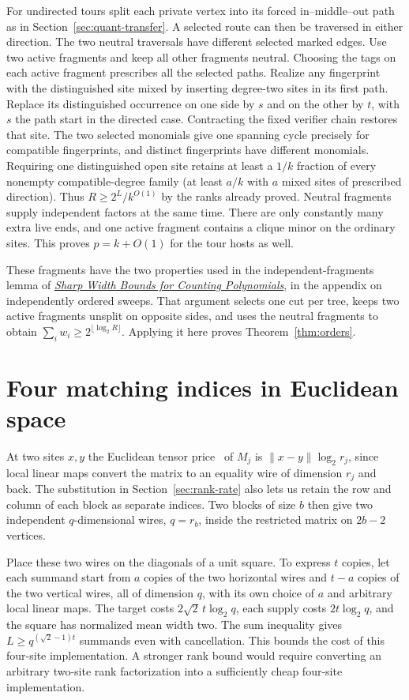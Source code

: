 \documentclass[11pt]{article}
\theoremstyle{definition}
\begin{document}
For undirected tours split each private vertex into its forced in--middle--out path as in Section~\ref{sec:quant-transfer}. A selected route can then be traversed in either direction. The two neutral traversals have different selected marked edges. Use two active fragments and keep all other fragments neutral. Choosing the tags on each active fragment prescribes all the selected paths. Realize any fingerprint with the distinguished site mixed by inserting degree-two sites in its first path. Replace its distinguished occurrence on one side by \(s\) and on the other by \(t\), with \(s\) the path start in the directed case. Contracting the fixed verifier chain restores that site. The two selected monomials give one spanning cycle precisely for compatible fingerprints, and distinct fingerprints have different monomials. Requiring one distinguished open site retains at least a \(1/k\) fraction of every nonempty compatible-degree family (at least \(a/k\) with \(a\) mixed sites of prescribed direction). Thus \(R\ge 2^L/k^{O(1)}\) by the ranks already proved. Neutral fragments supply independent factors at the same time. There are only constantly many extra live ends, and one active fragment contains a clique minor on the ordinary sites. This proves \(p=k+O(1)\) for the tour hosts as well.

These fragments have the two properties used in the independent-fragments lemma of \href{sharp-pathwidth-bases.pdf}{\emph{Sharp Width Bounds for Counting Polynomials}}, in the appendix on independently ordered sweeps. That argument selects one cut per tree, keeps two active fragments unsplit on opposite sides, and uses the neutral fragments to obtain \(\sum_i w_i\ge2^{\lfloor\log_2 R\rfloor}\). Applying it here proves Theorem~\ref{thm:orders}.

\section{Four matching indices in Euclidean space}
At two sites \(x,y\) the Euclidean tensor price~\cite{euclid} of \(M_j\) is \(\|x-y\|\log_2 r_j\), since local linear maps convert the matrix to an equality wire of dimension \(r_j\) and back. The substitution in Section~\ref{sec:rank-rate} also lets us retain the row and column of each block as separate indices. Two blocks of size \(b\) then give two independent \(q\)-dimensional wires, \(q=r_b\), inside the restricted matrix on \(2b-2\) vertices.

Place these two wires on the diagonals of a unit square. To express \(t\) copies, let each summand start from \(a\) copies of the two horizontal wires and \(t-a\) copies of the two vertical wires, all of dimension \(q\), with its own choice of \(a\) and arbitrary local linear maps. The target costs \(2\sqrt2\,t\log_2 q\), each supply costs \(2t\log_2 q\), and the square has normalized mean width two. The sum inequality gives \(L\ge q^{(\sqrt2-1)t}\) summands even with cancellation. This bounds the cost of this four-site implementation. A stronger rank bound would require converting an arbitrary two-site rank factorization into a sufficiently cheap four-site implementation.


{\small

}
\end{document}

